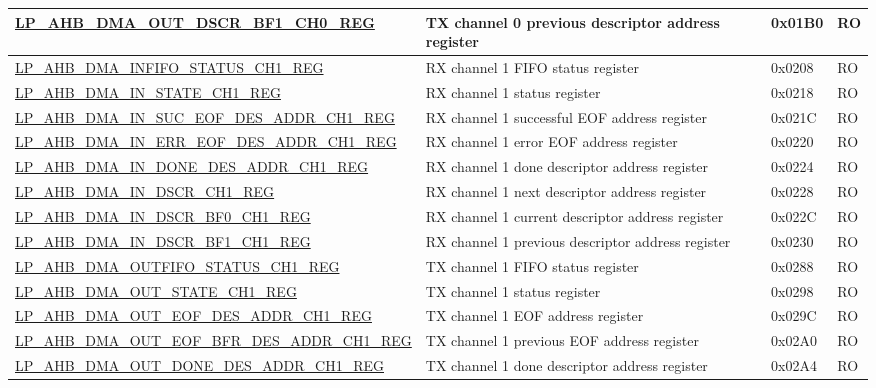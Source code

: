 \begin{longtable}{ | l | p{10cm} | p{1.3cm} | l | }
\hyperref[regdesc:LPAHBDMAOUTDSCRBF1CHNREG]{LP\_AHB\_DMA\_OUT\_DSCR\_BF1\_CH0\_REG} & TX channel 0 previous descriptor address register & 0x01B0 & RO \\ \hline
\hyperref[regdesc:LPAHBDMAINFIFOSTATUSCHNREG]{LP\_AHB\_DMA\_INFIFO\_STATUS\_CH1\_REG} & RX channel 1 FIFO status register & 0x0208 & RO \\ \hline
\hyperref[regdesc:LPAHBDMAINSTATECHNREG]{LP\_AHB\_DMA\_IN\_STATE\_CH1\_REG} & RX channel 1 status register & 0x0218 & RO \\ \hline
\hyperref[regdesc:LPAHBDMAINSUCEOFDESADDRCHNREG]{LP\_AHB\_DMA\_IN\_SUC\_EOF\_DES\_ADDR\_CH1\_REG} & RX channel 1 successful EOF address register & 0x021C & RO \\ \hline
\hyperref[regdesc:LPAHBDMAINERREOFDESADDRCHNREG]{LP\_AHB\_DMA\_IN\_ERR\_EOF\_DES\_ADDR\_CH1\_REG} & RX channel 1 error EOF address register & 0x0220 & RO \\ \hline
\hyperref[regdesc:LPAHBDMAINDONEDESADDRCHNREG]{LP\_AHB\_DMA\_IN\_DONE\_DES\_ADDR\_CH1\_REG} & RX channel 1 done descriptor address register & 0x0224 & RO \\ \hline
\hyperref[regdesc:LPAHBDMAINDSCRCHNREG]{LP\_AHB\_DMA\_IN\_DSCR\_CH1\_REG} & RX channel 1 next descriptor address register & 0x0228 & RO \\ \hline
\hyperref[regdesc:LPAHBDMAINDSCRBF0CHNREG]{LP\_AHB\_DMA\_IN\_DSCR\_BF0\_CH1\_REG} & RX channel 1 current descriptor address register & 0x022C & RO \\ \hline
\hyperref[regdesc:LPAHBDMAINDSCRBF1CHNREG]{LP\_AHB\_DMA\_IN\_DSCR\_BF1\_CH1\_REG} & RX channel 1 previous descriptor address register & 0x0230 & RO \\ \hline
\hyperref[regdesc:LPAHBDMAOUTFIFOSTATUSCHNREG]{LP\_AHB\_DMA\_OUTFIFO\_STATUS\_CH1\_REG} & TX channel 1 FIFO status register & 0x0288 & RO \\ \hline
\hyperref[regdesc:LPAHBDMAOUTSTATECHNREG]{LP\_AHB\_DMA\_OUT\_STATE\_CH1\_REG} & TX channel 1 status register & 0x0298 & RO \\ \hline
\hyperref[regdesc:LPAHBDMAOUTEOFDESADDRCHNREG]{LP\_AHB\_DMA\_OUT\_EOF\_DES\_ADDR\_CH1\_REG} & TX channel 1 EOF address register & 0x029C & RO \\ \hline
\hyperref[regdesc:LPAHBDMAOUTEOFBFRDESADDRCHNREG]{LP\_AHB\_DMA\_OUT\_EOF\_BFR\_DES\_ADDR\_CH1\_REG} & TX channel 1 previous EOF address register & 0x02A0 & RO \\ \hline
\hyperref[regdesc:LPAHBDMAOUTDONEDESADDRCHNREG]{LP\_AHB\_DMA\_OUT\_DONE\_DES\_ADDR\_CH1\_REG} & TX channel 1 done descriptor address register & 0x02A4 & RO \\ \hline

\end{longtable}
